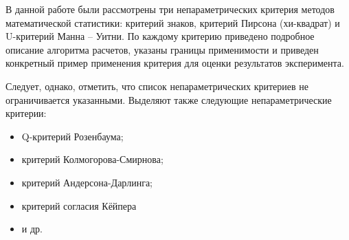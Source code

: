\documentclass[12pt]{article}
\begin{document}
В данной работе были рассмотрены три непараметрических критерия методов математической статистики: критерий знаков, критерий Пирсона (хи-квадрат) и U-критерий Манна – Уитни. По каждому критерию приведено подробное описание алгоритма расчетов, указаны границы применимости и приведен конкретный пример применения критерия для оценки результатов эксперимента.

Следует, однако, отметить, что список непараметрических критериев не ограничивается указанными. Выделяют также следующие непараметрические критерии:

\begin{itemize}
    \item Q-критерий Розенбаума;
    \item критерий Колмогорова-Смирнова;
    \item критерий Андерсона-Дарлинга;
    \item критерий согласия Кёйпера
    \item и др.
\end{itemize}
\end{document}
